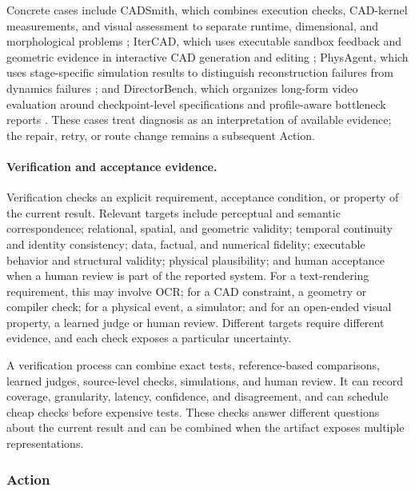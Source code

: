 Concrete cases include CADSmith, which combines execution checks, CAD-kernel measurements, and visual assessment to separate runtime, dimensional, and morphological problems \cite{barkley2026cadsmith}; IterCAD, which uses executable sandbox feedback and geometric evidence in interactive CAD generation and editing \cite{hu2026itercad}; PhysAgent, which uses stage-specific simulation results to distinguish reconstruction failures from dynamics failures \cite{li2026physagent}; and DirectorBench, which organizes long-form video evaluation around checkpoint-level specifications and profile-aware bottleneck reports \cite{avg260530090}. These cases treat diagnosis as an interpretation of available evidence; the repair, retry, or route change remains a subsequent Action.

\paragraph{Verification and acceptance evidence.}
Verification checks an explicit requirement, acceptance condition, or property of the current result. Relevant targets include perceptual and semantic correspondence; relational, spatial, and geometric validity; temporal continuity and identity consistency; data, factual, and numerical fidelity; executable behavior and structural validity; physical plausibility; and human acceptance when a human review is part of the reported system. For a text-rendering requirement, this may involve OCR; for a CAD constraint, a geometry or compiler check; for a physical event, a simulator; and for an open-ended visual property, a learned judge or human review. Different targets require different evidence, and each check exposes a particular uncertainty.

A verification process can combine exact tests, reference-based comparisons, learned judges, source-level checks, simulations, and human review. It can record coverage, granularity, latency, confidence, and disagreement, and can schedule cheap checks before expensive tests.  These checks answer different questions about the current result and can be combined when the artifact exposes multiple representations.


\subsubsection{Action}

